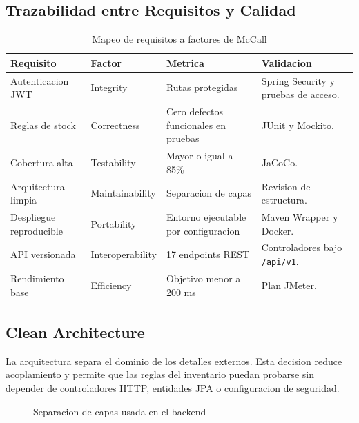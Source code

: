 \documentclass[11pt,oneside]{article}
\begin{document}
\subsection{Trazabilidad entre Requisitos y Calidad}

\begin{table}[H]
\centering
\small
\caption{Mapeo de requisitos a factores de McCall}
\begin{tabularx}{\textwidth}{p{}p{}p{}Y}
\toprule
Requisito & Factor & Metrica & Validacion\\
\midrule
Autenticacion JWT & Integrity & Rutas protegidas & Spring Security y pruebas de acceso.\\
Reglas de stock & Correctness & Cero defectos funcionales en pruebas & JUnit y Mockito.\\
Cobertura alta & Testability & Mayor o igual a 85\% & JaCoCo.\\
Arquitectura limpia & Maintainability & Separacion de capas & Revision de estructura.\\
Despliegue reproducible & Portability & Entorno ejecutable por configuracion & Maven Wrapper y Docker.\\
API versionada & Interoperability & 17 endpoints REST & Controladores bajo \texttt{/api/v1}.\\
Rendimiento base & Efficiency & Objetivo menor a 200 ms & Plan JMeter.\\
\bottomrule
\end{tabularx}
\end{table}

\subsection{Clean Architecture}

La arquitectura separa el dominio de los detalles externos. Esta decision reduce acoplamiento y permite que las reglas del inventario puedan probarse sin depender de controladores HTTP, entidades JPA o configuracion de seguridad.

\begin{figure}[H]
\centering
{}
\caption{Separacion de capas usada en el backend}
\end{figure}
\end{document}
